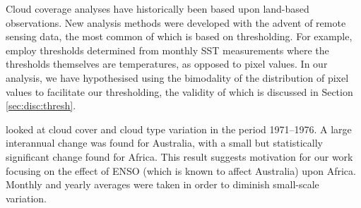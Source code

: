Cloud coverage analyses have historically been based upon land-based
observations. New analysis methods were developed with the advent of remote
sensing data, the most common of which is based on thresholding. For example,
\cite{derrien1993} employ thresholds determined from monthly SST measurements
where the thresholds themselves are temperatures, as opposed to pixel values. In
our analysis, we have hypothesised using the bimodality of the distribution of pixel
values to facilitate our thresholding, the validity of which is discussed in
Section \ref{sec:disc:thresh}.

\cite{warren2007} looked at cloud cover and cloud type variation in the period
1971--1976. A large interannual change was found for Australia, with a small but
statistically significant change found for Africa. This result suggests
motivation for our work focusing on the effect of ENSO (which is known to affect
Australia) upon Africa. Monthly and yearly averages were taken in order to
diminish small-scale variation.

